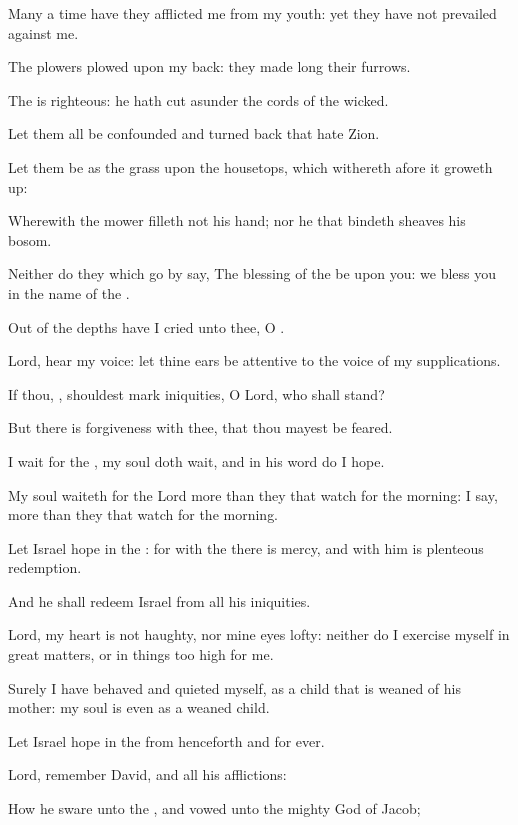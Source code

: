 \Verse Many a time have they afflicted me from my youth: yet they have not prevailed against me.

\Verse The plowers plowed upon my back: they made long their furrows.

\Verse The \LORD is righteous: he hath cut asunder the cords of the wicked.

\Verse Let them all be confounded and turned back that hate Zion.

\Verse Let them be as the grass upon the housetops, which withereth afore it groweth up:

\Verse Wherewith the mower filleth not his hand; nor he that bindeth sheaves his bosom.

\Verse Neither do they which go by say, The blessing of the \LORD be upon you: we bless you in the name of the \LORD.




\Chapter
\Verse Out of the depths have I cried unto thee, O \LORD.

\Verse Lord, hear my voice: let thine ears be attentive to the voice of my supplications.

\Verse If thou, \LORD, shouldest mark iniquities, O Lord, who shall stand?

\Verse But there is forgiveness with thee, that thou mayest be feared.

\Verse I wait for the \LORD, my soul doth wait, and in his word do I hope.

\Verse My soul waiteth for the Lord more than they that watch for the morning: I say, more than they that watch for the morning.

\Verse Let Israel hope in the \LORD: for with the \LORD there is mercy, and with him is plenteous redemption.

\Verse And he shall redeem Israel from all his iniquities.




\Chapter
\Verse Lord, my heart is not haughty, nor mine eyes lofty: neither do I exercise myself in great matters, or in things too high for me.

\Verse Surely I have behaved and quieted myself, as a child that is weaned of his mother: my soul is even as a weaned child.

\Verse Let Israel hope in the \LORD from henceforth and for ever.




\Chapter
\Verse Lord, remember David, and all his afflictions:

\Verse How he sware unto the \LORD, and vowed unto the mighty God of Jacob;


